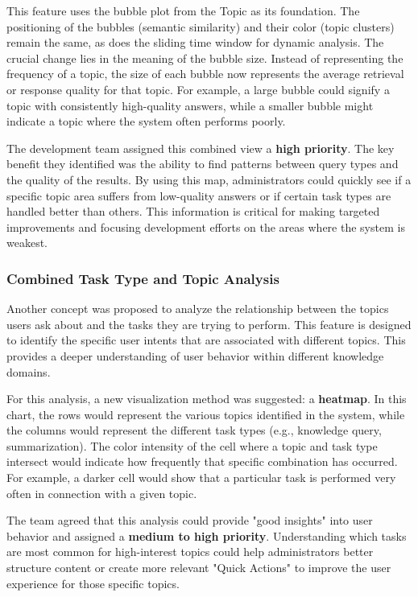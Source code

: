 \documentclass[
	english,
	ruledheaders=section,%
	class=report,%
	thesis={type=bachelor},%
	accentcolor=1b,%
	custommargins=true,%
	marginpar=false,%
	parskip=half-,%
	fontsize=11pt,%
	DIV=14,
]{tudapub}
\begin{document}
This feature uses the bubble plot from the Topic as its foundation. The positioning of the bubbles (semantic similarity) and their color (topic clusters) remain the same, as does the sliding time window for dynamic analysis. The crucial change lies in the meaning of the bubble size. Instead of representing the frequency of a topic, the size of each bubble now represents the average retrieval or response quality for that topic. For example, a large bubble could signify a topic with consistently high-quality answers, while a smaller bubble might indicate a topic where the system often performs poorly.

The development team assigned this combined view a \textbf{high priority}. The key benefit they identified was the ability to find patterns between query types and the quality of the results. By using this map, administrators could quickly see if a specific topic area suffers from low-quality answers or if certain task types are handled better than others. This information is critical for making targeted improvements and focusing development efforts on the areas where the system is weakest.
\subsubsection{Combined Task Type and Topic Analysis}
Another concept was proposed to analyze the relationship between the topics users ask about and the tasks they are trying to perform. This feature is designed to identify the specific user intents that are associated with different topics. This provides a deeper understanding of user behavior within different knowledge domains.

For this analysis, a new visualization method was suggested: a \textbf{heatmap}. In this chart, the rows would represent the various topics identified in the system, while the columns would represent the different task types (e.g., knowledge query, summarization). The color intensity of the cell where a topic and task type intersect would indicate how frequently that specific combination has occurred. For example, a darker cell would show that a particular task is performed very often in connection with a given topic.

The team agreed that this analysis could provide "good insights" into user behavior and assigned a \textbf{medium to high priority}. Understanding which tasks are most common for high-interest topics could help administrators better structure content or create more relevant "Quick Actions" to improve the user experience for those specific topics.
\end{document}
